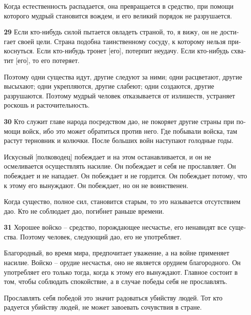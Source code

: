 \documentclass[a4paper]{article}
\begin{document}
{
Когда естественность распадается, она превращается в средство, при помощи которого мудрый становится вождем, и его
великий порядок не разрушается.}

{\ttfamily
\foreignlanguage{russian}{\textrm{\textbf{29}}}\foreignlanguage{russian}{\textrm{ Если кто-нибудь силой пытается
овладеть страной, то, я вижу, он не достигает своей цели. Страна подобна таинственному сосуду, к которому нельзя
прикоснуться. Если кто-нибудь тронет [его], потерпит неудачу. Если кто-нибудь схватит [его], то его потеряет.}}}

{
Поэтому одни существа идут, другие следуют за ними; одни расцветают, другие высыхают; одни укрепляются, другие слабеют;
одни создаются, другие разрушаются. Поэтому мудрый человек отказывается от излишеств, устраняет роскошь и
расточительность.}

{\ttfamily
\foreignlanguage{russian}{\textrm{\textbf{30}}}\foreignlanguage{russian}{\textrm{ Кто служит главе народа посредством
дао, не покоряет другие страны при помощи войск, ибо это может обратиться против него. Где побывали войска, там растут
терновник и колючки. После больших войн наступают голодные годы.}}}

{
Искусный [полководец] побеждает и на этом останавливается, и он не осмеливается осуществлять насилие. Он побеждает и
себя не прославляет. Он побеждает и не нападает. Он побеждает и не гордится. Он побеждает потому, что к этому его
вынуждают. Он побеждает, но он не воинственен.}

{
Когда существо, полное сил, становится старым, то это называется отсутствием дао. Кто не соблюдает дао, погибнет раньше
времени.}

{\ttfamily
\foreignlanguage{russian}{\textrm{\textbf{31}}}\foreignlanguage{russian}{\textrm{ Хорошее войско – средство, порождающее
несчастье, его ненавидят все существа. Поэтому человек, следующий дао, его не употребляет.}}}

{
Благородный, во время мира, предпочитает уважение, а на войне применяет насилие. Войско – орудие несчастья, оно не
является орудием благородного. Он употребляет его только тогда, когда к этому его вынуждают. Главное состоит в том,
чтобы соблюдать спокойствие, а в случае победы себя не прославлять.}

{
Прославлять себя победой это значит радоваться убийству людей. Тот кто радуется убийству людей, не может завоевать
сочувствия в стране.}
\end{document}
